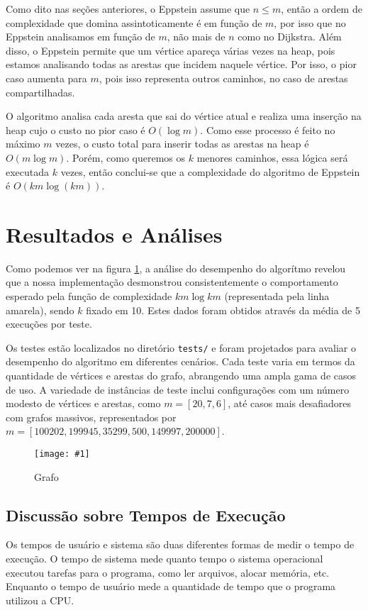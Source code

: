 \documentclass[12pt]{article}
\def\widthmod{}
\newcommand*\image[2]{\noindent \begin{figure}[htbp]
    \centering
    \texttt{[image: \#1]}
    \caption{#2}
    \label{fig: #1}
    \end{figure}
    }
\begin{document}
    Como dito nas seções anteriores, o Eppstein assume que $n \leq m$, então a ordem de complexidade que domina assintoticamente é em função de $m$, por isso que no Eppstein analisamos em função de $m$, não mais de $n$ como no Dijkstra. Além disso, o Eppstein permite que um vértice apareça várias vezes na heap, pois estamos analisando todas as arestas que incidem naquele vértice. Por isso, o pior caso aumenta para $m$, pois isso representa outros caminhos, no caso de arestas compartilhadas.
    
    O algoritmo analisa cada aresta que sai do vértice atual e realiza uma inserção na heap cujo o custo no pior caso é $O(\log m)$. Como esse processo é feito no máximo $m$ vezes, o custo total para inserir todas as arestas na heap é $O(m \log m)$. Porém, como queremos os $k$ menores caminhos, essa lógica será executada $k$ vezes, então conclui-se que a complexidade do algoritmo de Eppstein é $O(km \log (km))$.

    \newpage
    \section{Resultados e Análises}
    Como podemos ver na figura \ref{fig: runtimes}, a análise do desempenho do
    algorítmo revelou que a nossa implementação desmonstrou consistentemente o
    comportamento esperado pela função de complexidade $km \log km$ (representada
    pela linha amarela), sendo $k$ fixado em 10. Estes dados foram obtidos
    através da média de 5 execuções por teste.

    Os testes estão localizados no
    diretório \texttt{tests/} e foram projetados para avaliar o desempenho do
    algoritmo em diferentes cenários. Cada teste varia em termos da quantidade de
    vértices e arestas do grafo, abrangendo uma ampla gama de casos de uso. A
    variedade de instâncias de teste inclui configurações com um número modesto de
    vértices e arestas, como \( m = [20, 7, 6] \), até casos mais desafiadores com
    grafos massivos, representados por \( m = [100202, 199945, 35299, 500, 149997,
    200000] \).
 
    \def\widthmod{0.5}
    \image{runtimes}{Grafo}

    \subsection{Discussão sobre Tempos de Execução}
    Os tempos de usuário e sistema são duas diferentes formas de medir o tempo
    de execução. O tempo de sistema mede quanto tempo o sistema operacional
    executou tarefas para o programa, como ler arquivos, alocar memória, etc.
    Enquanto o tempo de usuário mede a quantidade de tempo que o programa
    utilizou a CPU.
\end{document}
